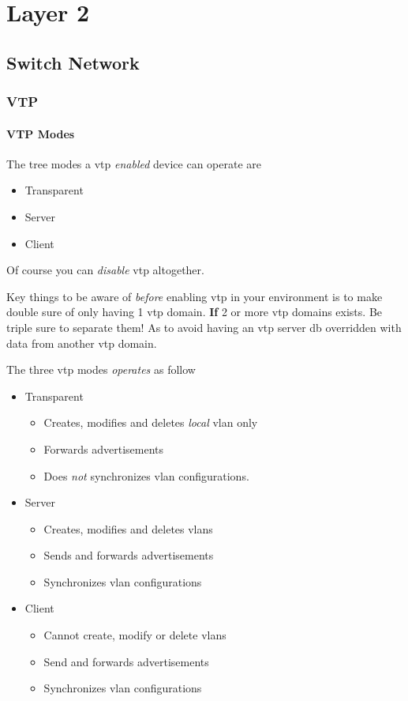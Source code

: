 \chapter{Layer 2}

\section{Switch Network}

\subsection{VTP}

\subsubsection{VTP Modes}
The tree modes a \gls{vtp} \textit{enabled} device can operate are
\begin{itemize}
    \item Transparent
    \item Server
    \item Client
\end{itemize}
Of course you can \textit{disable} \gls{vtp} altogether.

Key things to be aware of \textit{before} enabling \gls{vtp} in your environment is to make double sure of only having 1 \gls{vtp} domain. \textbf{If} 2 or more \gls{vtp} domains exists. Be triple sure to separate them! As to avoid having an \gls{vtp} server \gls{db} overridden with data from another \gls{vtp} domain.

The three \gls{vtp} modes \textit{operates} as follow
\begin{itemize}
    \item Transparent
    \begin{itemize}
        \item Creates, modifies and deletes \textit{local} \gls{vlan} only
        \item Forwards advertisements
        \item Does \textit{not} synchronizes vlan configurations.
    \end{itemize}
    \item Server
    \begin{itemize}
        \item Creates, modifies and deletes vlans
        \item Sends and forwards advertisements
        \item Synchronizes vlan configurations
    \end{itemize}
    \item Client
    \begin{itemize}
        \item Cannot create, modify or delete vlans
        \item Send and forwards advertisements
        \item Synchronizes vlan configurations
    \end{itemize}
\end{itemize}

